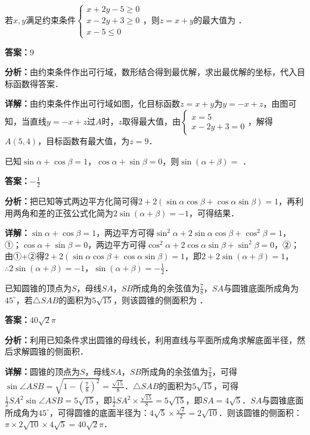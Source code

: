 \begin{question}[points=5]
若$x,y$满足约束条件$\begin{cases} x+2y-5\ge 0 \\ x-2y+3\ge 0 \\ x-5\le 0 \end{cases}$，则$z=x+y$的最大值为      ．
\fillin[{$9$}]
\begin{solution}
\textbf{答案：}$9$

\textbf{分析：}由约束条件作出可行域，数形结合得到最优解，求出最优解的坐标，代入目标函数得答案．

\textbf{详解：}由约束条件作出可行域如图，化目标函数$z=x+y$为$y=-x+z$，由图可知，当直线$y=-x+z$过$A$时，$z$取得最大值，由$\begin{cases} x=5 \\ x-2y+3=0 \end{cases}$，解得$A(5,4)$，目标函数有最大值，为$z=9$．
\end{solution}
\end{question}

\begin{question}[points=5]
已知$\sin\alpha+\cos\beta=1$，$\cos\alpha+\sin\beta=0$，则$\sin(\alpha+\beta)=$        ．
\fillin[{$-\frac{1}{2}$}]
\begin{solution}
\textbf{答案：}$-\frac{1}{2}$

\textbf{分析：}把已知等式两边平方化简可得$2+2(\sin\alpha\cos\beta+\cos\alpha\sin\beta)=1$，再利用两角和差的正弦公式化简为$2\sin(\alpha+\beta)=-1$，可得结果．

\textbf{详解：}$\sin\alpha+\cos\beta=1$，两边平方可得$\sin^2\alpha+2\sin\alpha\cos\beta+\cos^2\beta=1$，①；$\cos\alpha+\sin\beta=0$，两边平方可得$\cos^2\alpha+2\cos\alpha\sin\beta+\sin^2\beta=0$，②；由①+②得$2+2(\sin\alpha\cos\beta+\cos\alpha\sin\beta)=1$，即$2+2\sin(\alpha+\beta)=1$，$\therefore 2\sin(\alpha+\beta)=-1$，$\sin(\alpha+\beta)=-\frac{1}{2}$．
\end{solution}
\end{question}

\begin{question}[points=5]
已知圆锥的顶点为$S$，母线$SA$，$SB$所成角的余弦值为$\frac{7}{8}$，$SA$与圆锥底面所成角为$45^\circ$，若$\triangle SAB$的面积为$5\sqrt{15}$，则该圆锥的侧面积为          ．
\fillin[{$40\sqrt{2}\pi$}]
\begin{solution}
\textbf{答案：}$40\sqrt{2}\pi$

\textbf{分析：}利用已知条件求出圆锥的母线长，利用直线与平面所成角求解底面半径，然后求解圆锥的侧面积．

\textbf{详解：}圆锥的顶点为$S$，母线$SA$，$SB$所成角的余弦值为$\frac{7}{8}$，可得$\sin\angle ASB=\sqrt{1-(\frac{7}{8})^2}=\frac{\sqrt{15}}{8}$．$\triangle SAB$的面积为$5\sqrt{15}$，可得$\frac{1}{2}SA^2\sin\angle ASB=5\sqrt{15}$，即$\frac{1}{2}SA^2\times\frac{\sqrt{15}}{8}=5\sqrt{15}$，即$SA=4\sqrt{5}$．$SA$与圆锥底面所成角为$45^\circ$，可得圆锥的底面半径为：$4\sqrt{5}\times\frac{\sqrt{2}}{2}=2\sqrt{10}$．则该圆锥的侧面积：$\pi\times2\sqrt{10}\times4\sqrt{5}=40\sqrt{2}\pi$．
\end{solution}
\end{question}

